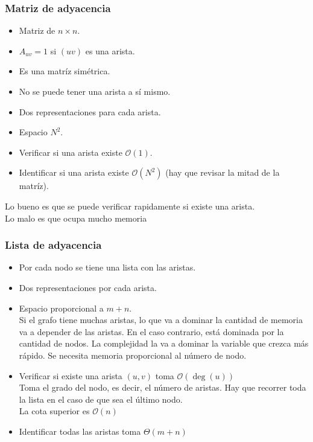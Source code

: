 \documentclass[12pt, fleqn]{article}
\begin{document}
            \subsubsection{Matriz de adyacencia}
                \begin{itemize}
                    \item Matriz de $n \times n$.
                    \item $A_{uv} = 1$ si $(uv)$ es una arista.
                    \item Es una matríz simétrica.
                    \item No se puede tener una arista a sí mismo.
                    \item Dos representaciones para cada arista.
                    \item Espacio $N^2$.
                    \item Verificar si una arista existe $\mathcal{O}(1)$. 
                    \item Identificar si una arista existe $\mathcal{O}(N^2)$ (hay que revisar la mitad de la matríz).
                \end{itemize}
                Lo bueno es que se puede verificar rapidamente si existe una arista.\\
                Lo malo es que ocupa mucho memoria
            \subsubsection{Lista de adyacencia}
                \begin{itemize}
                    \item Por cada nodo se tiene una lista con las aristas.
                    \item Dos representaciones por cada arista.
                    \item Espacio proporcional a $m+n$.\\ 
                        Si el grafo tiene muchas aristas, lo que va a dominar la cantidad de memoria va a depender de las aristas.
                        En el caso contrario, está dominada por la cantidad de nodos. La complejidad la va a dominar la variable que crezca más rápido.
                        Se necesita memoria proporcional al número de nodo.
                    \item Verificar si existe una arista $(u,v)$ toma $\mathcal{O}(\deg(u))$\\
                        Toma el grado del nodo, es decir, el número de aristas. Hay que recorrer toda la lista en el caso de que sea el último nodo.\\
                        La cota superior es $\mathcal{O}(n)$
                    \item Identificar todas las aristas toma $\Theta(m + n)$
                \end{itemize}
\end{document}

